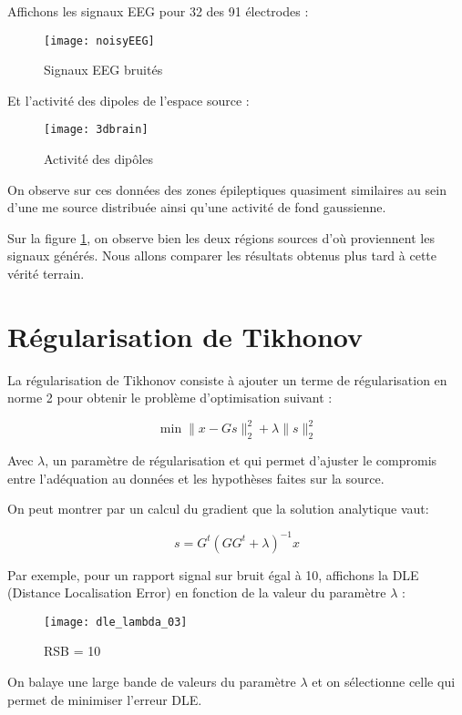 \documentclass[12pt,a4paper,titlepage]{article}
\begin{document}
Affichons les signaux EEG pour 32 des 91 électrodes :

\begin{figure}[H]
    \caption{Signaux EEG bruités}
    \texttt{[image: noisyEEG]}
    \centering
\end{figure}

Et l'activité des dipoles de l'espace source :

\begin{figure}[H]
    \caption{Activité des dipôles}
    \label{brain}
    \texttt{[image: 3dbrain]}
    \centering
\end{figure}

On observe sur ces données des zones épileptiques quasiment similaires
au sein d'une me source distribuée ainsi qu'une activité de fond gaussienne.

Sur la figure \ref{brain}, on observe bien les deux régions sources
d'où proviennent les signaux générés. Nous allons comparer les résultats
obtenus plus tard à cette vérité terrain.

\section{Régularisation de Tikhonov}

La régularisation de Tikhonov consiste à ajouter un terme de régularisation
en norme 2 pour obtenir le problème d'optimisation suivant :

$$ \min \lVert x - Gs \rVert^2_2 + \lambda \lVert s \rVert^2_2 $$

Avec $\lambda$, un paramètre de régularisation et qui permet d'ajuster
le compromis entre l'adéquation au données et les hypothèses faites sur
la source.

On peut montrer par un calcul du gradient que la solution analytique vaut:

$$ s = G^t(GG^t + \lambda)^{-1}x $$

Par exemple, pour un rapport signal sur bruit égal à 10, affichons la
DLE (Distance Localisation Error)  en fonction de la valeur du
paramètre $\lambda$ :

\begin{figure}[H]
    \caption{RSB = 10}
    \label{lambdas}
    \texttt{[image: dle\_lambda\_03]}
    \centering
\end{figure}

On balaye une large bande de valeurs du paramètre $\lambda$ et on
sélectionne celle qui permet de minimiser l'erreur DLE.
\end{document}
